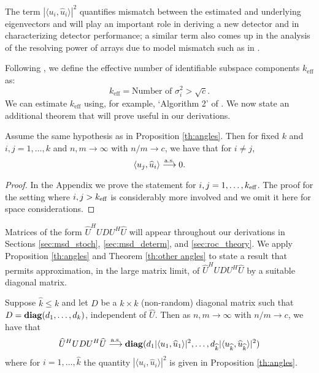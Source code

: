 The term $|\langle u_i,\widehat{u}_i\rangle|^2$ quantifies mismatch between the estimated and underlying eigenvectors and will play an important role in deriving a new detector and in characterizing detector performance; a similar term also comes up in the analysis of the resolving power of arrays due to model mismatch such as in \cite{cox1973resolving}.


Following \cite{nadakuditi2008sample}, we define the effective number of identifiable subspace components $k_\text{eff}$ as:
\begin{equation}\label{eq:keff}
\boxed{k_\text{eff} = \text{Number of } \sigma_i^2 > \sqrt{c}}.
\end{equation}
We can estimate $k_\text{eff}$ using, for example,  `Algorithm 2' of  \cite{nadakuditi2010fundamental}. We now state an additional theorem that will prove useful in our derivations.\\

\begin{Th}\label{th:other angles}
Assume the same hypothesis as in Proposition \ref{th:angles}. Then for fixed $k$ and  $i,j = 1, \ldots, k $ and $n, m \longrightarrow \infty$ with $n/m \to c$, we have that for $i \neq j$,
\begin{equation}
\langle u_j,\widehat{u}_i\rangle \overset{\textrm{a.s.}}{\longrightarrow} 0.
\end{equation}
\end{Th}
\begin{proof}
In the Appendix we prove the statement for $i, j = 1, \ldots, k_\text{eff}$. The proof for the setting where $i, j > k_\text{eff}$ is considerably more involved and we omit it here for space considerations.
\end{proof}\vskip0.25cm

Matrices of the form $\widehat{U}^HU D U^H\widehat{U}$ will appear throughout our derivations in Sections \ref{sec:msd_stoch}, \ref{sec:msd_determ}, and \ref{sec:roc_theory}. We apply Proposition \ref{th:angles} and Theorem \ref{th:other angles} to state a result that permits approximation, in the large matrix limit, of  $\widehat{U}^HU D U^H\widehat{U}$ by a suitable diagonal matrix.  \\

\begin{Corr}\label{corr:matrix}
Suppose $\widehat{k}\leq k$ and let $D$ be a $k \times k$ (non-random) diagonal matrix such that $D=\mathop{\bf diag}(d_1,\ldots,d_{k})$, independent of $\widehat{U}$. Then as $n,m \longrightarrow \infty$ with $n/m \to c$, we have that
\begin{equation*}
\widehat{U}^HU D U^H\widehat{U}\overset{\textrm{a.s.}}{\longrightarrow} \mathop{\bf diag}(d_1 |\langle u_1,\widehat{u}_1\rangle|^2,\dots, d_{\widehat{k}} |\langle u_{\widehat{k}},\widehat{u}_{\widehat{k}}\rangle|^2)
\end{equation*}
where for $i=1,\dots,\widehat{k}$ the quantity $|\langle u_i,\widehat{u}_i\rangle|^2$ is given in Proposition \ref{th:angles}.
\end{Corr}

